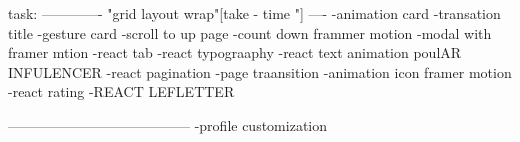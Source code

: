task:
-------------
"grid layout wrap"[take - time "]
----
-animation card
-transation title 
-gesture card
-scroll to up page 
-count down frammer motion
-modal with framer mtion
-react tab
-react typograaphy
-react text animation  poulAR INFULENCER
-react pagination
-page  traansition
-animation icon framer motion
-react rating
-REACT LEFLETTER 

---------------------------------------
-profile customization

